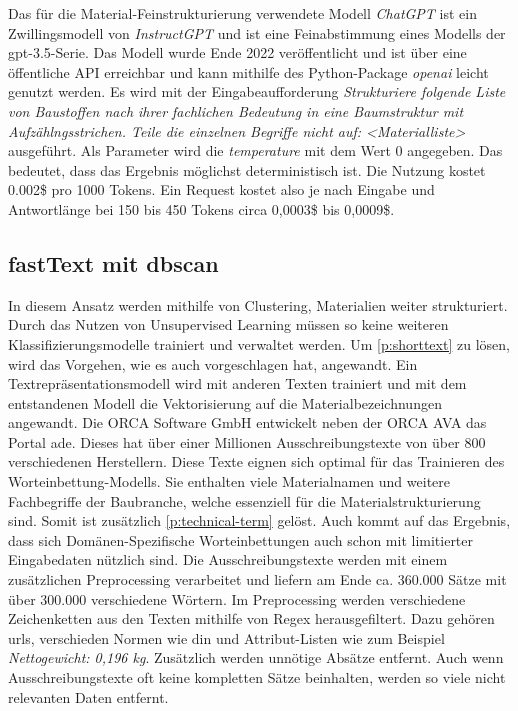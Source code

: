 Das für die Material-Feinstrukturierung verwendete Modell \textit{ChatGPT} ist ein Zwillingsmodell von \textit{InstructGPT} und ist eine Feinabstimmung eines Modells der \ac{gpt}-3.5-Serie. \citep[vgl.][]{OpenAI2022-la}
Das Modell wurde Ende 2022 veröffentlicht und ist über eine öffentliche API erreichbar und kann mithilfe des Python-Package \textit{openai} leicht genutzt werden. Es wird mit der Eingabeaufforderung \textit{\glqq Strukturiere folgende Liste von Baustoffen nach ihrer fachlichen Bedeutung in eine Baumstruktur mit Aufzählngsstrichen. Teile die einzelnen Begriffe nicht auf: <Materialliste>\grqq{}} ausgeführt. Als Parameter wird die \textit{temperature} mit dem Wert 0 angegeben. Das bedeutet, dass das Ergebnis möglichst deterministisch ist. \citep[vgl.][]{openai_reference} Die Nutzung kostet 0.002\$ pro 1000 Tokens. \citep[vgl.][]{Openai_pricing} Ein Request kostet also je nach Eingabe und Antwortlänge bei 150 bis 450 Tokens circa 0,0003\$ bis 0,0009\$.

\subsection{fastText mit \acf{dbscan}}
\label{c:conception:fine-structuring:dbscan}
In diesem Ansatz werden mithilfe von Clustering, Materialien weiter strukturiert. Durch das Nutzen von Unsupervised Learning müssen so keine weiteren Klassifizierungsmodelle trainiert und verwaltet werden.
Um \autoref{p:shorttext} zu lösen, wird das Vorgehen, wie es auch \cite{Qingyuan2019} vorgeschlagen hat, angewandt. Ein Textrepräsentationsmodell wird mit anderen Texten trainiert und mit dem entstandenen Modell die Vektorisierung auf die Materialbezeichnungen angewandt. 
Die \glqq ORCA Software GmbH\grqq{} entwickelt neben der ORCA AVA das Portal \ac{ade}. Dieses hat über einer Millionen Ausschreibungstexte von über 800 verschiedenen Herstellern. Diese Texte eignen sich optimal für das Trainieren des Worteinbettung-Modells. Sie enthalten viele Materialnamen und weitere Fachbegriffe der Baubranche, welche essenziell für die Materialstrukturierung sind. Somit ist zusätzlich \autoref{p:technical-term} gelöst. Auch \cite{nooralahzadeh2018evaluation} kommt auf das Ergebnis, dass sich Domänen-Spezifische Worteinbettungen auch schon mit limitierter Eingabedaten nützlich sind.
Die Ausschreibungstexte werden mit einem zusätzlichen Preprocessing verarbeitet und liefern am Ende ca. 360.000 Sätze mit über 300.000 verschiedene Wörtern. Im Preprocessing werden verschiedene Zeichenketten aus den Texten mithilfe von Regex herausgefiltert. Dazu gehören \ac{url}s, verschieden Normen wie \ac{din} und Attribut-Listen wie zum Beispiel \textit{Nettogewicht: 0,196 kg}. Zusätzlich werden unnötige Absätze entfernt.
Auch wenn Ausschreibungstexte oft keine kompletten Sätze beinhalten, werden so viele nicht relevanten Daten entfernt.

